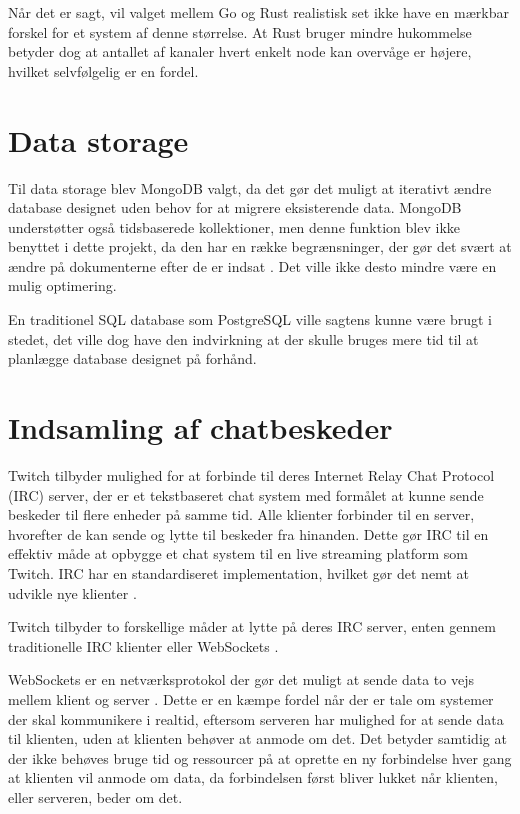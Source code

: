 \documentclass{article}
\begin{document}
Når det er sagt, vil valget mellem Go og Rust realistisk set ikke have en mærkbar forskel for et system af denne størrelse. At Rust bruger mindre hukommelse betyder dog at antallet af kanaler hvert enkelt node kan overvåge er højere, hvilket selvfølgelig er en fordel.


\section{Data storage}
Til data storage blev MongoDB valgt, da det gør det muligt at iterativt ændre database designet uden behov for at migrere eksisterende data.
MongoDB understøtter også tidsbaserede kollektioner, men denne funktion blev ikke benyttet i dette projekt, da den har en række begrænsninger, der gør det svært at ændre på dokumenterne efter de er indsat \cite{mongodb_time_nodate}. Det ville ikke desto mindre være en mulig optimering.

En traditionel SQL database som PostgreSQL ville sagtens kunne være brugt i stedet, det ville dog have den indvirkning at der skulle bruges mere tid til at planlægge database designet på forhånd.

\section{Indsamling af chatbeskeder}
Twitch tilbyder mulighed for at forbinde til deres Internet Relay Chat Protocol (IRC) server, der er et tekstbaseret chat system med formålet at kunne sende beskeder til flere enheder på samme tid. Alle klienter forbinder til en server, hvorefter de kan sende og lytte til beskeder fra hinanden. Dette gør IRC til en effektiv måde at opbygge et chat system til en live streaming platform som Twitch. IRC har en standardiseret implementation, hvilket gør det nemt at udvikle nye klienter \cite{oikarinen_internet_1993}.


Twitch tilbyder to forskellige måder at lytte på deres IRC server, enten gennem traditionelle IRC klienter eller WebSockets \cite{twitch_twitch_2022}.

WebSockets er en netværksprotokol der gør det muligt at sende data to vejs mellem klient og server \cite{melnikov_websocket_2011}. Dette er en kæmpe fordel når der er tale om systemer der skal kommunikere i realtid, eftersom serveren har mulighed for at sende data til klienten, uden at klienten behøver at anmode om det. Det betyder samtidig at der ikke behøves bruge tid og ressourcer på at oprette en ny forbindelse hver gang at klienten vil anmode om data, da forbindelsen først bliver lukket når klienten, eller serveren, beder om det.
\end{document}
